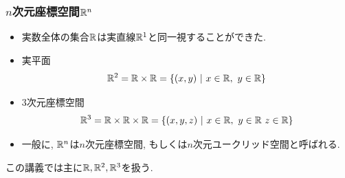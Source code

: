 


\begin{frame}
\frametitle{$n$次元座標空間$\mathbb{R}^n$}   


\begin{Ex}
\begin{itemize}
\item 実数全体の集合$\mathbb{R}$は実直線$\mathbb{R}^1$と同一視することができた. 
\item 実平面
$$
\mathbb{R}^2=\mathbb{R} \times \mathbb{R}=\{(x,y) \ | \ x \in \mathbb{R}, \ y \in \mathbb{R}\}
$$
\item $3$次元座標空間
$$
\R^3=\R \times \R \times \R=\{(x,y,z) \ | \ x \in \R, \ y \in \R \ z\in \R\}
$$
\item 一般に, $\mathbb{R}^n$は$n$次元座標空間, もしくは$n$次元ユークリッド空間と呼ばれる. 
\end{itemize}
\end{Ex}

この講義では主に$\mathbb{R}, \mathbb{R}^2,\mathbb{R}^3$を扱う. 

\end{frame}



%
%
%





